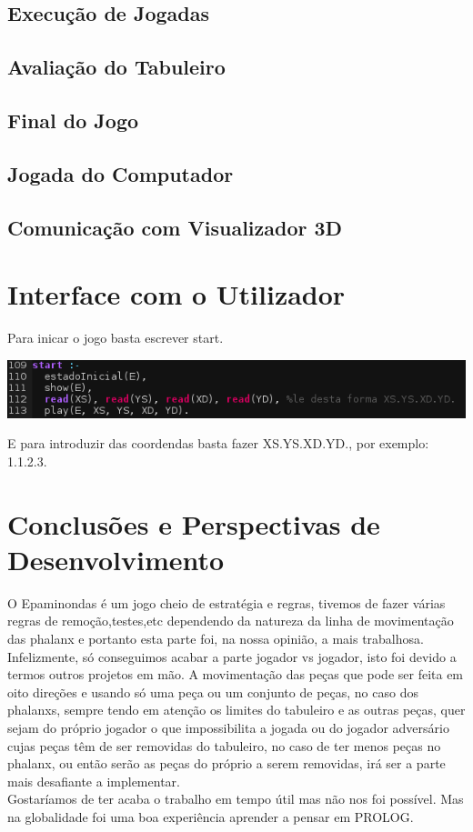 \documentclass[a4paper]{article}
\begin{document}
\subsection{Execução de Jogadas}

\subsection{Avaliação do Tabuleiro}

\subsection{Final do Jogo}

\subsection{Jogada do Computador}

\subsection{Comunicação com Visualizador 3D}

\section{Interface com o Utilizador}
Para inicar o jogo basta escrever start.
\begin{center}
\includegraphics[scale=0.70]{iniciar.png}
\end{center}
E para introduzir das coordendas basta fazer XS.YS.XD.YD., por exemplo: 1.1.2.3.

\section{Conclusões e Perspectivas de Desenvolvimento}
O Epaminondas é um jogo cheio de estratégia e regras, tivemos de fazer várias regras de remoção,testes,etc dependendo da natureza da linha de movimentação das phalanx e portanto esta parte foi, na nossa opinião, a mais trabalhosa. Infelizmente, só conseguimos acabar a parte jogador vs jogador, isto foi devido a termos outros projetos em mão. A movimentação das peças que pode ser feita em oito direções e usando só uma peça ou um conjunto de peças, no caso dos phalanxs, sempre tendo em atenção os limites do tabuleiro e as outras peças, quer sejam do próprio jogador o que impossibilita a jogada ou do jogador adversário cujas peças têm de ser removidas do tabuleiro, no caso de ter menos peças no phalanx, ou então serão as peças do próprio a serem removidas, irá ser a parte mais desafiante a implementar.
\\\linebreak
Gostaríamos de ter acaba o trabalho em tempo útil mas não nos foi possível. Mas na globalidade foi uma boa experiência aprender a pensar em PROLOG.
\\\linebreak

\clearpage
{}
\renewcommand\refname{Bibliografia}


\end{document}
